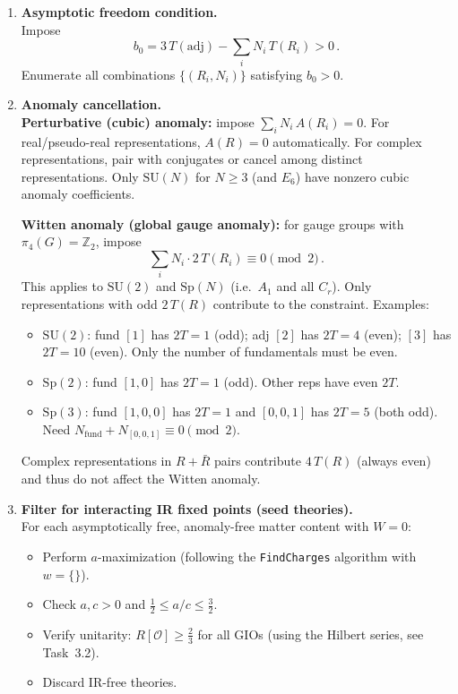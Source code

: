 \documentclass[12pt]{article}
\begin{document}
\begin{enumerate}[label=\textbf{2.\arabic*}]

\item \textbf{Asymptotic freedom condition.} \\
  Impose
  \begin{equation}
    b_0 = 3\, T(\mathrm{adj}) - \sum_i N_i \, T(R_i) > 0\,.
  \end{equation}
  Enumerate all combinations $\{(R_i, N_i)\}$ satisfying $b_0 > 0$.

\item \textbf{Anomaly cancellation.} \\
  \textbf{Perturbative (cubic) anomaly:} impose $\sum_i N_i \, A(R_i) = 0$.
  For real/pseudo-real representations, $A(R) = 0$ automatically.
  For complex representations, pair with conjugates or cancel among distinct representations.
  Only $\mathrm{SU}(N)$ for $N \geq 3$ (and $E_6$) have nonzero cubic anomaly coefficients.

  \textbf{Witten anomaly (global gauge anomaly):}
  for gauge groups with $\pi_4(G) = \mathbb{Z}_2$, impose
  \begin{equation}
    \sum_i N_i \cdot 2\,T(R_i) \equiv 0 \pmod{2}\,.
  \end{equation}
  This applies to $\mathrm{SU}(2)$ and $\mathrm{Sp}(N)$ (i.e.\ $A_1$ and all $C_r$).
  Only representations with odd $2\,T(R)$ contribute to the constraint.
  Examples:
  \begin{itemize}
    \item $\mathrm{SU}(2)$: fund $[1]$ has $2T = 1$ (odd); adj $[2]$ has $2T = 4$ (even);
      $[3]$ has $2T = 10$ (even). Only the number of fundamentals must be even.
    \item $\mathrm{Sp}(2)$: fund $[1,0]$ has $2T = 1$ (odd). Other reps have even $2T$.
    \item $\mathrm{Sp}(3)$: fund $[1,0,0]$ has $2T = 1$ and $[0,0,1]$ has $2T = 5$ (both odd).
      Need $N_{\mathrm{fund}} + N_{[0,0,1]} \equiv 0 \pmod{2}$.
  \end{itemize}
  Complex representations in $R + \bar{R}$ pairs contribute $4\,T(R)$ (always even) and thus
  do not affect the Witten anomaly.

\item \textbf{Filter for interacting IR fixed points (seed theories).} \\
  For each asymptotically free, anomaly-free matter content with $W = 0$:
  \begin{itemize}
    \item Perform $a$-maximization (following the \texttt{FindCharges} algorithm with $w = \{\}$).
    \item Check $a, c > 0$ and $\tfrac{1}{2} \leq a/c \leq \tfrac{3}{2}$.
    \item Verify unitarity: $R[\mathcal{O}] \geq \tfrac{2}{3}$ for all GIOs (using the Hilbert series, see Task~3.2).
    \item Discard IR-free theories.
  \end{itemize}


\end{enumerate}
\end{document}
